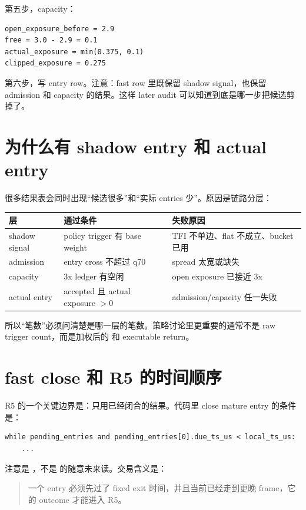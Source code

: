 第五步，capacity：

\begin{lstlisting}
open_exposure_before = 2.9
free = 3.0 - 2.9 = 0.1
actual_exposure = min(0.375, 0.1)
clipped_exposure = 0.275
\end{lstlisting}

第六步，写 entry row。注意：fast row 里既保留 shadow signal，也保留 admission 和 capacity 的结果。这样 later audit 可以知道到底是哪一步把候选剪掉了。

\section{为什么有 shadow entry 和 actual entry}

很多结果表会同时出现“候选很多”和“实际 entries 少”。原因是链路分层：

\begin{longtable}{p{}p{}p{}}
\toprule
层 & 通过条件 & 失败原因 \\
\midrule
shadow signal & policy trigger 有 base weight & TFI 不单边、flat 不成立、bucket 已用 \\
admission & entry cross 不超过 q70 & spread 太宽或缺失 \\
capacity & 3x ledger 有空闲 & open exposure 已接近 3x \\
actual entry & accepted 且 actual exposure \(>0\) & admission/capacity 任一失败 \\
\bottomrule
\end{longtable}

所以“笔数”必须问清楚是哪一层的笔数。策略讨论里更重要的通常不是 raw trigger count，而是加权后的  和 executable return。

\section{fast close 和 R5 的时间顺序}

R5 的一个关键边界是：只用已经闭合的结果。代码里 close mature entry 的条件是：

\begin{lstlisting}
while pending_entries and pending_entries[0].due_ts_us < local_ts_us:
    ...
\end{lstlisting}

注意是 ，不是 \code{<=} 的随意未来读。交易含义是：

\begin{quote}
一个 entry 必须先过了 fixed exit 时间，并且当前已经走到更晚 frame，它的 outcome 才能进入 R5。
\end{quote}

